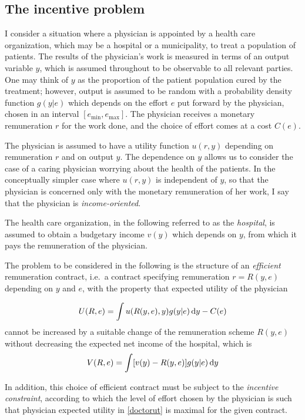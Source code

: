 \subsection{The incentive problem} %
\label{sub:the_incentive_problem}
I consider a situation where a physician is appointed by a health care organization, which may be a hospital or a municipality, to treat a population of patients. The results of the physician's work is measured in terms of an output variable $y$, which is assumed throughout to be observable to all relevant parties. One may think of $y$ as the proportion of the patient population cured by the treatment; however, output is assumed to be random with a probability density function $g(y|e)$ which depends on the effort $e$ put forward by the physician, chosen in an interval $\left[e_{\min},e_{\max}\right]$. The physician receives a monetary remuneration $r$ for the work done, and the choice of effort comes at a cost $C(e)$.

The physician is assumed to have a utility function $u(r,y)$ depending on remuneration $r$ and on output $y$. The dependence on $y$ allows us to consider the case of a caring physician worrying about the health of the patients. In the conceptually simpler case where $u(r,y)$ is independent of $y$, so that the physician is concerned only with the monetary remuneration of her work, I say that the physician is \emph{income-oriented}.

The health care organization, in the following referred to as the \emph{hospital}, is assumed to obtain a budgetary income $v(y)$ which depends on $y$, from which it pays the remuneration of the physician.

The problem to be considered in the following is the structure of an \emph{efficient} remuneration contract, i.e.\ a contract specifying remuneration $r=R(y,e)$ depending on $y$ and $e$, with the property that expected utility of the physician

\begin{align}
\label{doctorut}
    U(R,e)=\int u(R(y,e),y)g(y|e)\dif y-C(e)
\end{align}
cannot be increased by a suitable change of the remuneration scheme $R(y,e)$ without decreasing the expected net income of the hospital, which is
\[
    V(R,e)=\int [v(y)-R(y,e)]g(y|e)\dif y
\]

In addition, this choice of efficient contract must be subject to the \emph{incentive constraint}, according to which the level of effort chosen by the physician is such that physician expected utility in \cref{doctorut} is maximal for the given contract.

